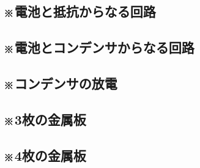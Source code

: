 \documentclass[../../ps_a.tex]{subfiles}
\begin{document}
    \subsection{※電池と抵抗からなる回路}
        
        \vspace{20pt}    
        \vfill
    \subsection{※電池とコンデンサからなる回路}
        
        \vspace{20pt}    
        \vfill
    \subsection{※コンデンサの放電}
        
        \vspace{20pt}    
        \vfill
    \subsection{※3枚の金属板}
        
        \vspace{20pt}    
        \vfill
    \subsection{※4枚の金属板}
        
        \vspace{20pt}    
        \vfill
\end{document}
